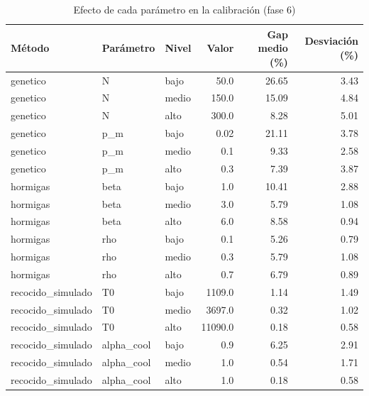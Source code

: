 \begin{table}[H]
\centering
\renewcommand{\arraystretch}{1.3}
\begin{tabular}{|l|l|l|r|r|r|}
\hline
Método & Parámetro & Nivel & Valor & Gap medio (\%) & Desviación (\%) \\
\hline
genetico & N & bajo & 50.0 & 26.65 & 3.43 \\
genetico & N & medio & 150.0 & 15.09 & 4.84 \\
genetico & N & alto & 300.0 & 8.28 & 5.01 \\
genetico & p\_m & bajo & 0.02 & 21.11 & 3.78 \\
genetico & p\_m & medio & 0.1 & 9.33 & 2.58 \\
genetico & p\_m & alto & 0.3 & 7.39 & 3.87 \\
hormigas & beta & bajo & 1.0 & 10.41 & 2.88 \\
hormigas & beta & medio & 3.0 & 5.79 & 1.08 \\
hormigas & beta & alto & 6.0 & 8.58 & 0.94 \\
hormigas & rho & bajo & 0.1 & 5.26 & 0.79 \\
hormigas & rho & medio & 0.3 & 5.79 & 1.08 \\
hormigas & rho & alto & 0.7 & 6.79 & 0.89 \\
recocido\_simulado & T0 & bajo & 1109.0 & 1.14 & 1.49 \\
recocido\_simulado & T0 & medio & 3697.0 & 0.32 & 1.02 \\
recocido\_simulado & T0 & alto & 11090.0 & 0.18 & 0.58 \\
recocido\_simulado & alpha\_cool & bajo & 0.9 & 6.25 & 2.91 \\
recocido\_simulado & alpha\_cool & medio & 1.0 & 0.54 & 1.71 \\
recocido\_simulado & alpha\_cool & alto & 1.0 & 0.18 & 0.58 \\
\hline
\end{tabular}
\caption{Efecto de cada parámetro en la calibración (fase 6)}
\label{tab:calibracion}
\end{table}